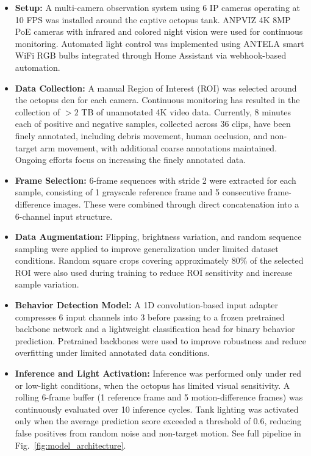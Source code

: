 \documentclass[conference]{IEEEtran}
\begin{document}
\begin{itemize}[leftmargin=*, itemsep=2pt, topsep=2pt]

\item \textbf{Setup:} A multi-camera observation system using 6 IP cameras operating at 10 FPS was installed around the captive octopus tank. ANPVIZ 4K 8MP PoE cameras with infrared and colored night vision were used for continuous monitoring. Automated light control was implemented using ANTELA smart WiFi RGB bulbs integrated through Home Assistant via webhook-based automation.

\item \textbf{Data Collection:} A manual Region of Interest (ROI) was selected around the octopus den for each camera. Continuous monitoring has resulted in the collection of $>2$ TB of unannotated 4K video data. Currently, 8 minutes each of positive and negative samples, collected across 36 clips, have been finely annotated, including debris movement, human occlusion, and non-target arm movement, with additional coarse annotations maintained. Ongoing efforts focus on increasing the finely annotated data.

\item \textbf{Frame Selection:} 6-frame sequences with stride 2 were extracted for each sample, consisting of 1 grayscale reference frame and 5 consecutive frame-difference images. These were combined through direct concatenation into a 6-channel input structure.

\item \textbf{Data Augmentation:} Flipping, brightness variation, and random sequence sampling were applied to improve generalization under limited dataset conditions. Random square crops covering approximately 80\% of the selected ROI were also used during training to reduce ROI sensitivity and increase sample variation.

\item \textbf{Behavior Detection Model:} A 1D convolution-based input adapter compresses 6 input channels into 3 before passing to a frozen pretrained backbone network and a lightweight classification head for binary behavior prediction. Pretrained backbones were used to improve robustness and reduce overfitting under limited annotated data conditions.

\item \textbf{Inference and Light Activation:} Inference was performed only under red or low-light conditions, when the octopus has limited visual sensitivity. A rolling 6-frame buffer (1 reference frame and 5 motion-difference frames) was continuously evaluated over 10 inference cycles. Tank lighting was activated only when the average prediction score exceeded a threshold of 0.6, reducing false positives from random noise and non-target motion. See full pipeline in Fig.~\ref{fig:model_architecture}.

\end{itemize}
\end{document}
